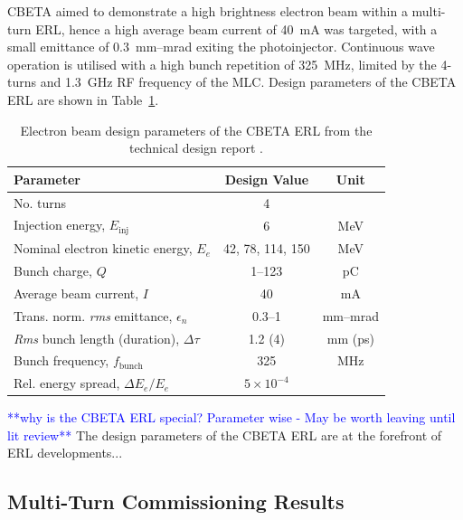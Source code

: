 \documentclass[../main.tex]{subfiles}
\begin{document}
CBETA aimed to demonstrate a high brightness electron beam within a multi-turn ERL, hence a high average beam current of 40~\si{\milli\ampere} was targeted, with a small emittance of 0.3~\si{\milli\meter}--\si{\milli\radian} exiting the photoinjector. Continuous wave operation is utilised with a high bunch repetition of 325~\si{\mega\hertz}, limited by the 4-turns and 1.3~\si{\giga\hertz} RF frequency of the MLC. Design parameters of the CBETA ERL \cite{hoffstaetter2017cbeta} are shown in Table~\ref{tab:CBETA_ERL_design_parameters}.

\begin{table}[!h]
\centering
\caption{Electron beam design parameters of the CBETA ERL from the technical design report \cite{hoffstaetter2017cbeta}.}
\vspace{3mm}
\begin{tabular}{lcc}
\hline\hline
Parameter & Design Value & Unit \\
\hline
No. turns & 4 & \\
Injection energy, $E_{\mathrm{inj}}$ & 6 & \si{\mega\electronvolt} \\
Nominal electron kinetic energy, $E_{e}$ & 42, 78, 114, 150 & \si{\mega\electronvolt} \\
Bunch charge, $Q$ & 1--123 & \si{\pico\coulomb} \\
Average beam current, $I$ & 40 & \si{\milli\ampere} \\
Trans. norm. \textit{rms} emittance, $\epsilon_{n}$ & 0.3--1 & \si{\milli\meter}--\si{\milli\radian} \\
\textit{Rms} bunch length (duration), $\Delta\tau$ & 1.2 (4) & \si{\milli\meter} (\si{\pico\second}) \\
Bunch frequency, $f_{\mathrm{bunch}}$ & 325 & \si{\mega\hertz} \\
Rel. energy spread, $\Delta E_{e}/E_{e}$ & $5\times 10^{-4}$ & \\
\hline
\end{tabular}
\label{tab:CBETA_ERL_design_parameters}
\end{table}

\textcolor{blue}{**why is the CBETA ERL special? Parameter wise - May be worth leaving until lit review**}
The design parameters of the CBETA ERL are at the forefront of ERL developments...

\subsection{Multi-Turn Commissioning Results}
\end{document}
